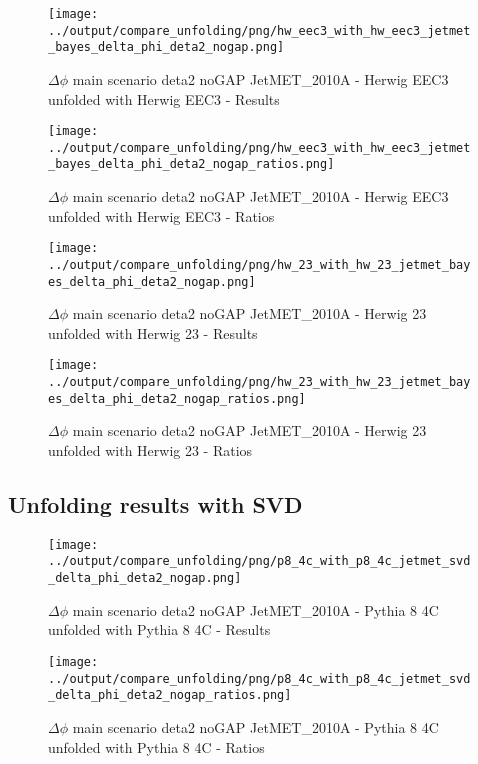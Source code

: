 \documentclass[11pt]{book}
\begin{document}
\begin{figure}[ht]
\centering
\texttt{[image: ../output/compare\_unfolding/png/hw\_eec3\_with\_hw\_eec3\_jetmet\_bayes\_delta\_phi\_deta2\_nogap.png]}
\caption{$\Delta\phi$ main scenario deta2 noGAP JetMET\_2010A - Herwig EEC3 unfolded with Herwig EEC3 - Results}
\label{hw_eec3_hw_eec3_jetmet_bayes_delta_phi_deta2_nogap_a}
\end{figure}

\begin{figure}[ht]
\centering
\texttt{[image: ../output/compare\_unfolding/png/hw\_eec3\_with\_hw\_eec3\_jetmet\_bayes\_delta\_phi\_deta2\_nogap\_ratios.png]}
\caption{$\Delta\phi$ main scenario deta2 noGAP JetMET\_2010A - Herwig EEC3 unfolded with Herwig EEC3 - Ratios}
\label{hw_eec3_hw_eec3_jetmet_bayes_delta_phi_deta2_nogap_b}
\end{figure}

\begin{figure}[ht]
\centering
\texttt{[image: ../output/compare\_unfolding/png/hw\_23\_with\_hw\_23\_jetmet\_bayes\_delta\_phi\_deta2\_nogap.png]}
\caption{$\Delta\phi$ main scenario deta2 noGAP JetMET\_2010A - Herwig 23 unfolded with Herwig 23 - Results}
\label{hw_23_hw_23_jetmet_bayes_delta_phi_deta2_nogap_a}
\end{figure}

\begin{figure}[ht]
\centering
\texttt{[image: ../output/compare\_unfolding/png/hw\_23\_with\_hw\_23\_jetmet\_bayes\_delta\_phi\_deta2\_nogap\_ratios.png]}
\caption{$\Delta\phi$ main scenario deta2 noGAP JetMET\_2010A - Herwig 23 unfolded with Herwig 23 - Ratios}
\label{hw_23_hw_23_jetmet_bayes_delta_phi_deta2_nogap_b}
\end{figure}


\clearpage
\subsection{Unfolding results with SVD}

\begin{figure}[ht]
\centering
\texttt{[image: ../output/compare\_unfolding/png/p8\_4c\_with\_p8\_4c\_jetmet\_svd\_delta\_phi\_deta2\_nogap.png]}
\caption{$\Delta\phi$ main scenario deta2 noGAP JetMET\_2010A - Pythia 8 4C unfolded with Pythia 8 4C - Results}
\label{p8_p8_jetmet_svd_delta_phi_deta2_nogap_a}
\end{figure}

\begin{figure}[ht]
\centering
\texttt{[image: ../output/compare\_unfolding/png/p8\_4c\_with\_p8\_4c\_jetmet\_svd\_delta\_phi\_deta2\_nogap\_ratios.png]}
\caption{$\Delta\phi$ main scenario deta2 noGAP JetMET\_2010A - Pythia 8 4C unfolded with Pythia 8 4C - Ratios}
\label{p8_p8_jetmet_svd_delta_phi_deta2_nogap_b}
\end{figure}
\end{document}
